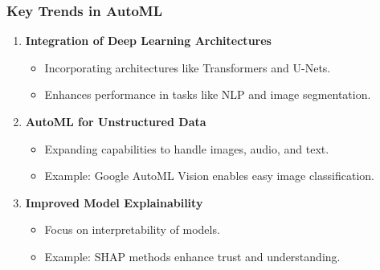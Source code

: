 \documentclass[aspectratio=169]{beamer}
\begin{document}
\begin{frame}[fragile]
  \frametitle{Key Trends in AutoML}
  \begin{enumerate}
    \item \textbf{Integration of Deep Learning Architectures}
      \begin{itemize}
        \item Incorporating architectures like Transformers and U-Nets.
        \item Enhances performance in tasks like NLP and image segmentation.
      \end{itemize}
    
    \item \textbf{AutoML for Unstructured Data}
      \begin{itemize}
        \item Expanding capabilities to handle images, audio, and text.
        \item Example: Google AutoML Vision enables easy image classification.
      \end{itemize}
    
    \item \textbf{Improved Model Explainability}
      \begin{itemize}
        \item Focus on interpretability of models.
        \item Example: SHAP methods enhance trust and understanding.
      \end{itemize}
  \end{enumerate}
\end{frame}
\end{document}
